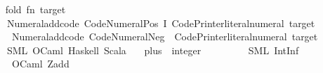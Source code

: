 \begin{isabellebody}
%
\isadelimML
\isanewline
%
\endisadelimML
%
\isatagML
{}\isamarkupfalse%
\ {\isacartoucheopen}\isanewline
\ \ fold\ {\isacharparenleft}{\kern0pt}fn\ target\ {\isacharequal}{\kern0pt}{\isachargreater}{\kern0pt}\isanewline
\ \ \ \ Numeral{\isachardot}{\kern0pt}add{\isacharunderscore}{\kern0pt}code\ \isactrlconstUNDERSCOREname {\isasymopen}Code{\isacharunderscore}{\kern0pt}Numeral{\isachardot}{\kern0pt}Pos{\isasymclose}\ I\ Code{\isacharunderscore}{\kern0pt}Printer{\isachardot}{\kern0pt}literal{\isacharunderscore}{\kern0pt}numeral\ target\isanewline
\ \ \ \ {\isacharhash}{\kern0pt}{\isachargreater}{\kern0pt}\ Numeral{\isachardot}{\kern0pt}add{\isacharunderscore}{\kern0pt}code\ \isactrlconstUNDERSCOREname {\isasymopen}Code{\isacharunderscore}{\kern0pt}Numeral{\isachardot}{\kern0pt}Neg{\isasymclose}\ {\isacharparenleft}{\kern0pt}{\isachartilde}{\kern0pt}{\isacharparenright}{\kern0pt}\ Code{\isacharunderscore}{\kern0pt}Printer{\isachardot}{\kern0pt}literal{\isacharunderscore}{\kern0pt}numeral\ target{\isacharparenright}{\kern0pt}\isanewline
\ \ \ \ {\isacharbrackleft}{\kern0pt}{\isachardoublequote}{\kern0pt}SML{\isachardoublequote}{\kern0pt}{\isacharcomma}{\kern0pt}\ {\isachardoublequote}{\kern0pt}OCaml{\isachardoublequote}{\kern0pt}{\isacharcomma}{\kern0pt}\ {\isachardoublequote}{\kern0pt}Haskell{\isachardoublequote}{\kern0pt}{\isacharcomma}{\kern0pt}\ {\isachardoublequote}{\kern0pt}Scala{\isachardoublequote}{\kern0pt}{\isacharbrackright}{\kern0pt}\isanewline
{\isacartoucheclose}%
\endisatagML
{\isafoldML}%
%
\isadelimML
\isanewline
%
\endisadelimML
\isanewline
{}\isamarkupfalse%
\isanewline
\ \ \ {\isachardoublequoteopen}plus\ {\isacharcolon}{\kern0pt}{\isacharcolon}{\kern0pt}\ integer\ {\isasymRightarrow}\ {\isacharunderscore}{\kern0pt}\ {\isasymRightarrow}\ {\isacharunderscore}{\kern0pt}{\isachardoublequoteclose}\ {\isasymrightharpoonup}\isanewline
\ \ \ \ {\isacharparenleft}{\kern0pt}SML{\isacharparenright}{\kern0pt}\ {\isachardoublequoteopen}IntInf{\isachardot}{\kern0pt}{\isacharplus}{\kern0pt}\ {\isacharparenleft}{\kern0pt}{\isacharparenleft}{\kern0pt}{\isacharunderscore}{\kern0pt}{\isacharparenright}{\kern0pt}{\isacharcomma}{\kern0pt}\ {\isacharparenleft}{\kern0pt}{\isacharunderscore}{\kern0pt}{\isacharparenright}{\kern0pt}{\isacharparenright}{\kern0pt}{\isachardoublequoteclose}\isanewline
\ \ \ \ \ {\isacharparenleft}{\kern0pt}OCaml{\isacharparenright}{\kern0pt}\ {\isachardoublequoteopen}Z{\isachardot}{\kern0pt}add{\isachardoublequoteclose}\isanewline

\end{isabellebody}
